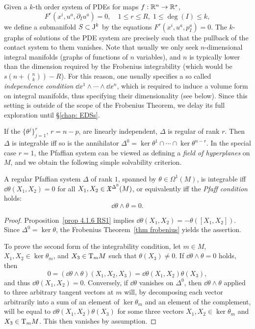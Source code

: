 \begin{rem}
    Given a $k$-th order system of PDEs for maps $f:\mathbb{R}^n\to \mathbb{R}^s$, 
    \[F^r(x^i,u^a,\partial_I u^a)=0,\quad 1\leq r\leq R,\; 1\leq \deg(I)\leq k,\]
    we define a submanifold $S\subset \mathrm{J}^k$ by the equations $F^r(x^i,u^a,p_I^a)=0$. The $k$-graphs of solutions of the PDE system are precisely such that the pullback of the contact system to them vanishes. Note that usually we only seek $n$-dimensional integral manifolds (graphs of functions of $n$ variables), and $n$ is typically lower than the dimension required by the Frobenius integrability (which would be $s\left(n+\binom{n}{k}\right)-R$). For this reason, one usually specifies a so called \emph{independence condition} $\dd x^1\wedge\cdots\wedge\dd x^n$, which is required to induce a volume form on integral manifolds, thus specifying their dimensionality (see below). Since this setting is outside of the scope of the Frobenius Theorem, we delay its full exploration until \S\ref{chap: EDSs}.
\end{rem}

If the $\{\theta^j\}_{j=1}^r$, $r=n-p$, are linearly independent, $\Delta$ is regular of rank $r$. Then $\Delta$ is integrable iff so is the annihilator $\Delta^0=\ker\theta^1\cap\cdots\cap\ker\theta^{n-r}$. In the special case $r=1$, the Pfaffian system can be viewed as defining a \emph{field of hyperplanes} on $M$, and we obtain the following simple solvability criterion.

\begin{prop}\label{prop 4.7.6 RS1 pfaffian rank 1}
    A regular Pfaffian system $\Delta$ of rank $1$, spanned by $\theta\in\Omega^1(M)$, is integrable iff $\dd\theta(X_1,X_2)=0$ for all $X_1,X_2\in\mathfrak{X}^{\Delta^0}(M)$, or equivalently iff the \emph{Pfaff condition} holds:
    \[\dd\theta\wedge\theta=0.\]
\end{prop}
\begin{proof}
    Proposition~\ref{prop 4.1.6 RS1} implies $\dd\theta(X_1,X_2)=-\theta([X_1,X_2])$. Since $\Delta^0=\ker\theta$, the Frobenius Theorem~\ref{thm frobenius} yields the assertion. 

    To prove the second form of the integrability condition, let $m\in M$, $X_1,X_2\in\ker\theta_m$, and $X_3\in \mathrm{T}_mM$ such that $\theta(X_3)\neq 0$. If $\dd\theta\wedge\theta=0$ holds, then 
    \[0=(\dd\theta\wedge\theta)(X_1,X_2,X_3)=\dd\theta(X_1,X_2)\theta(X_3),\]
    and thus $\dd \theta(X_1,X_2)=0$. Conversely, if $\dd\theta$ vanishes on $\Delta^0$, then $\dd \theta\wedge\theta$ applied to three arbitrary tangent vectors at $m$ will, by decomposing each vector arbitrarily into a sum of an element of $\ker\theta_m$ and an element of the complement, will be equal to $\dd \theta(X_1,X_2)\theta(X_3)$ for some three vectors $X_1,X_2\in \ker\theta_m$ and $X_3\in \mathrm{T}_m M$. This then vanishes by assumption.
\end{proof}

